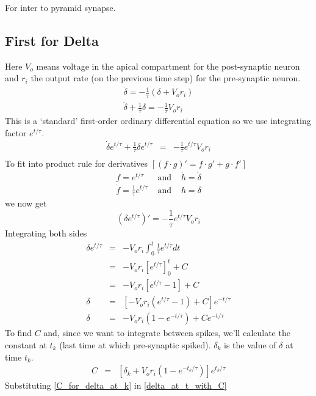 For inter to pyramid synapse.
\subsection{First for Delta}
Here $V_{o}$ means voltage in the apical compartment for the post-synaptic neuron and $r_{i}$ the output rate (on the previous time step) for the pre-synaptic neuron.
\begin{eqnarray}
  \dot{\delta} = -\frac{1}{\tau}\left(\delta + V_{o} r_{i}\right)\\
  \dot{\delta} + \frac{1}{\tau}\delta = -\frac{1}{\tau} V_{o} r_{i}
\end{eqnarray}
This is a `standard' first-order ordinary differential equation so we use integrating factor $e^{t/\tau}$.
\begin{eqnarray}
  \dot{\delta}e^{t/\tau} + \frac{1}{\tau}\delta e^{t/\tau} &=& -\frac{1}{\tau} e^{t/\tau}V_{o} r_{i} \\
\end{eqnarray}
To fit into product rule for derivatives $\left[(f\cdot g)' = f\cdot g' + g\cdot f'\right]$
\begin{eqnarray}
f = e^{t/\tau} &\text{ and }& \dot{h} = \dot{\delta}\\
\dot{f} = \frac{1}{\tau} e^{t/\tau}  &\text{ and }& h = \delta
\end{eqnarray}
we now get
\begin{equation}
\left(\delta e^{t/\tau}\right)' = -\frac{1}{\tau} e^{t/\tau} V_{o} r_{i} 
\end{equation}
Integrating both sides
\begin{eqnarray}
\delta e^{t/\tau} &=& -V_{o} r_{i} \int_{0}^{t} \frac{1}{\tau} e^{t/\tau} dt \\
    &=& -V_{o} r_{i} \left[e^{t/\tau}\right]_{0}^{t} + C\\
    &=& -V_{o} r_{i} \left[e^{t/\tau} - 1\right] + C \\
\delta &=& \left[-V_{o} r_{i} \left(e^{t/\tau} - 1\right) + C \right] e^{-t/\tau}\\
\delta &=& -V_{o} r_{i} \left(1 - e^{-t/\tau} \right) + Ce^{-t/\tau}
\label{delta_at_t_with_C}
\end{eqnarray}
To find $C$ and, since we want to integrate between spikes, we'll calculate the constant at $t_k$ (last time at which pre-synaptic spiked). $\delta_k$ is the value of $\delta$ at time $t_k$.
\begin{eqnarray}
C &=& \left[\delta_k + V_{o} r_{i} \left(1 - e^{-t_k/\tau} \right)\right] e^{t_k/\tau}
\label{C_for_delta_at_k}
\end{eqnarray}
Substituting \ref{C_for_delta_at_k} in \ref{delta_at_t_with_C}

